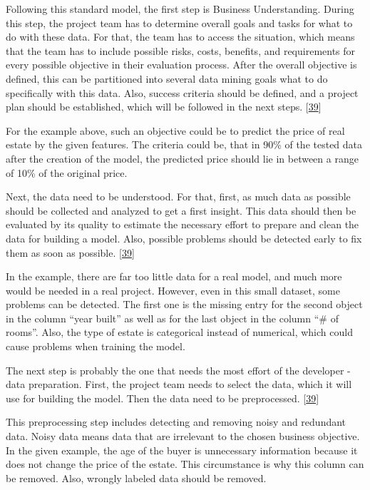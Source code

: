 \documentclass[12pt,english,a4paper,oneside,,tablecaptionabove]{scrbook}
\begin{document}
Following this standard model, the first step is Business Understanding.
During this step, the project team has to determine overall goals and
tasks for what to do with these data. For that, the team has to access
the situation, which means that the team has to include possible risks,
costs, benefits, and requirements for every possible objective in their
evaluation process. After the overall objective is defined, this can be
partitioned into several data mining goals what to do specifically with
this data. Also, success criteria should be defined, and a project plan
should be established, which will be followed in the next steps.
{[}\protect\hyperlink{ref-Wirth2000}{39}{]}

For the example above, such an objective could be to predict the price
of real estate by the given features. The criteria could be, that in
90\% of the tested data after the creation of the model, the predicted
price should lie in between a range of 10\% of the original price.

Next, the data need to be understood. For that, first, as much data as
possible should be collected and analyzed to get a first insight. This
data should then be evaluated by its quality to estimate the necessary
effort to prepare and clean the data for building a model. Also,
possible problems should be detected early to fix them as soon as
possible. {[}\protect\hyperlink{ref-Wirth2000}{39}{]}

In the example, there are far too little data for a real model, and much
more would be needed in a real project. However, even in this small
dataset, some problems can be detected. The first one is the missing
entry for the second object in the column \enquote{year built} as well
as for the last object in the column \enquote{\# of rooms}. Also, the
type of estate is categorical instead of numerical, which could cause
problems when training the model.

The next step is probably the one that needs the most effort of the
developer - data preparation. First, the project team needs to select
the data, which it will use for building the model. Then the data need
to be preprocessed. {[}\protect\hyperlink{ref-Wirth2000}{39}{]}

This preprocessing step includes detecting and removing noisy and
redundant data. Noisy data means data that are irrelevant to the chosen
business objective. In the given example, the age of the buyer is
unnecessary information because it does not change the price of the
estate. This circumstance is why this column can be removed. Also,
wrongly labeled data should be removed.
\end{document}
